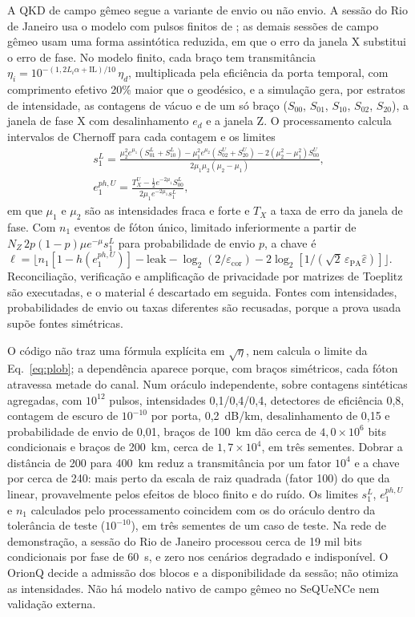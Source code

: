 \documentclass[12pt]{article}
\providecommand{\citeasnoun}[1]{\cite{#1}}
\begin{document}
A QKD de campo gêmeo segue a variante de envio ou não envio. A sessão do Rio de
Janeiro usa o modelo com pulsos finitos de \citeasnoun{jiang2019}; as demais
sessões de campo gêmeo usam uma forma assintótica reduzida, em que o erro da
janela X substitui o erro de fase. No modelo finito, cada braço tem transmitância
$\eta_i=10^{-(1{,}2L_i\alpha+\mathrm{IL})/10}\,\eta_d$, multiplicada pela
eficiência da porta temporal, com comprimento efetivo 20\% maior que o
geodésico, e a simulação gera, por estratos de intensidade, as
contagens de vácuo e de um só braço ($S_{00}$, $S_{01}$, $S_{10}$, $S_{02}$,
$S_{20}$), a janela de fase X com desalinhamento $e_d$ e a janela Z. O
processamento calcula intervalos de Chernoff para cada contagem e os limites
\begin{gather}
s_1^L=\frac{\mu_2^2e^{\mu_1}(S_{01}^L+S_{10}^L)-\mu_1^2e^{\mu_2}(S_{02}^U+S_{20}^U)-2(\mu_2^2-\mu_1^2)S_{00}^U}{2\mu_1\mu_2(\mu_2-\mu_1)},\nonumber\\
e_1^{ph,U}=\frac{T_X^U-\tfrac12e^{-2\mu_1}S_{00}^L}{2\mu_1e^{-2\mu_1}s_1^L},
\label{eq:sns}
\end{gather}
em que $\mu_1$ e $\mu_2$ são as intensidades fraca e forte e $T_X$ a taxa de
erro da janela de fase. Com $n_1$ eventos de fóton único, limitado
inferiormente a partir de $N_Z\,2p(1-p)\mu e^{-\mu}s_1^L$ para probabilidade de
envio $p$, a chave é
$\ell=\lfloor n_1[1-h(e_1^{ph,U})]-\mathrm{leak}-\log_2(2/\varepsilon_{\mathrm{cor}})-2\log_2[1/(\sqrt2\,\varepsilon_{\mathrm{PA}}\hat\varepsilon)]\rfloor$.
Reconciliação, verificação e amplificação de privacidade por matrizes de Toeplitz
são executadas, e o material é descartado em seguida. Fontes com intensidades,
probabilidades de envio ou taxas diferentes são recusadas, porque a prova usada
supõe fontes simétricas.

O código não traz uma fórmula explícita em $\sqrt{\eta}$, nem calcula o limite da
Eq.~\ref{eq:plob}; a dependência aparece porque, com braços simétricos, cada
fóton atravessa metade do canal. Num oráculo independente, sobre contagens
sintéticas agregadas, com $10^{12}$ pulsos, intensidades 0,1/0,4/0,4, detectores de eficiência 0,8, contagem de
escuro de $10^{-10}$ por porta, 0,2~dB/km, desalinhamento de 0,15 e probabilidade
de envio de 0,01, braços de 100~km dão cerca de $4{,}0\times10^{6}$ bits
condicionais e braços de 200~km, cerca de $1{,}7\times10^{4}$, em três sementes.
Dobrar a distância de 200 para 400~km reduz a transmitância por um fator
$10^4$ e a chave por cerca de 240: mais perto da escala de raiz quadrada (fator
100) do que da linear, provavelmente pelos efeitos de bloco finito e do ruído.
Os limites $s_1^L$, $e_1^{ph,U}$ e $n_1$ calculados pelo processamento coincidem
com os do oráculo dentro da tolerância de teste ($10^{-10}$), em três sementes de
um caso de teste.
Na rede de demonstração, a sessão do Rio de Janeiro processou cerca de 19 mil
bits condicionais por fase de 60~s, e zero nos cenários degradado e
indisponível. O OrionQ decide a admissão dos blocos e a disponibilidade da
sessão; não otimiza as intensidades. Não há modelo nativo de campo gêmeo no
SeQUeNCe nem validação externa.
\end{document}
